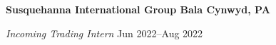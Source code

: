 \textbf{Susquehanna International Group \hfill Bala Cynwyd, PA}\par

\textit{Incoming Trading Intern} \hfill Jun 2022--Aug 2022